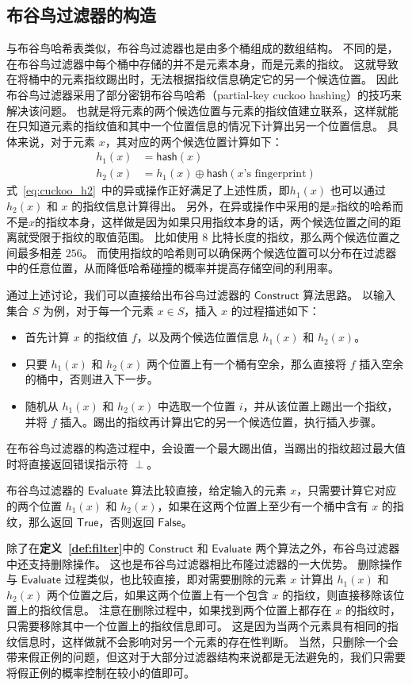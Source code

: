 \subsection{布谷鸟过滤器的构造}

与布谷鸟哈希表类似，布谷鸟过滤器也是由多个桶组成的数组结构。
不同的是，在布谷鸟过滤器中每个桶中存储的并不是元素本身，而是元素的指纹。
这就导致在将桶中的元素指纹踢出时，无法根据指纹信息确定它的另一个候选位置。
因此布谷鸟过滤器采用了部分密钥布谷鸟哈希（partial-key cuckoo hashing）的技巧来解决该问题。
也就是将元素的两个候选位置与元素的指纹值建立联系，这样就能在只知道元素的指纹值和其中一个位置信息的情况下计算出另一个位置信息。
具体来说，对于元素 $x$，其对应的两个候选位置计算如下：
\begin{align}
  h_1(x) & = \mathsf{hash}(x) \\
  h_2(x) & = h_1(x) \oplus \mathsf{hash}(x\mbox{'s fingerprint}) \label{eq:cuckoo_h2}
\end{align}
式~\ref{eq:cuckoo_h2}~中的异或操作正好满足了上述性质，即$h_1(x)$ 也可以通过 $h_2(x)$ 和 $x$ 的指纹信息计算得出。
另外，在异或操作中采用的是$x$指纹的哈希而不是$x$的指纹本身，这样做是因为如果只用指纹本身的话，两个候选位置之间的距离就受限于指纹的取值范围。
比如使用 $8$ 比特长度的指纹，那么两个候选位置之间最多相差 $256$。
而使用指纹的哈希则可以确保两个候选位置可以分布在过滤器中的任意位置，从而降低哈希碰撞的概率并提高存储空间的利用率。

通过上述讨论，我们可以直接给出布谷鸟过滤器的 $\mathsf{Construct}$ 算法思路。
以输入集合 $S$ 为例，对于每一个元素 $x\in S$，插入 $x$ 的过程描述如下：
\begin{itemize}
  \item 首先计算 $x$ 的指纹值 $f$，以及两个候选位置信息 $h_1(x)$ 和 $h_2(x)$。
  \item 只要 $h_1(x)$ 和 $h_2(x)$ 两个位置上有一个桶有空余，那么直接将 $f$ 插入空余的桶中，否则进入下一步。
  \item 随机从 $h_1(x)$ 和 $h_2(x)$ 中选取一个位置 $i$，并从该位置上踢出一个指纹，并将 $f$ 插入。踢出的指纹再计算出它的另一个候选位置，执行插入步骤。
\end{itemize}
在布谷鸟过滤器的构造过程中，会设置一个最大踢出值，当踢出的指纹超过最大值时将直接返回错误指示符 $\perp$。

布谷鸟过滤器的 $\mathsf{Evaluate}$ 算法比较直接，给定输入的元素 $x$，只需要计算它对应的两个位置 $h_1(x)$ 和 $h_2(x)$，如果在这两个位置上至少有一个桶中含有 $x$ 的指纹，那么返回 $\mathsf{True}$，否则返回 $\mathsf{False}$。

除了在\textbf{定义~\ref{def:filter}}中的 $\mathsf{Construct}$ 和 $\mathsf{Evaluate}$ 两个算法之外，布谷鸟过滤器中还支持删除操作。
这也是布谷鸟过滤器相比布隆过滤器的一大优势。
删除操作与 $\mathsf{Evaluate}$ 过程类似，也比较直接，即对需要删除的元素 $x$ 计算出 $h_1(x)$ 和 $h_2(x)$ 两个位置之后，如果这两个位置上有一个包含 $x$ 的指纹，则直接移除该位置上的指纹信息。
注意在删除过程中，如果找到两个位置上都存在 $x$ 的指纹时，只需要移除其中一个位置上的指纹信息即可。
这是因为当两个元素具有相同的指纹信息时，这样做就不会影响对另一个元素的存在性判断。
当然，只删除一个会带来假正例的问题，但这对于大部分过滤器结构来说都是无法避免的，我们只需要将假正例的概率控制在较小的值即可。

